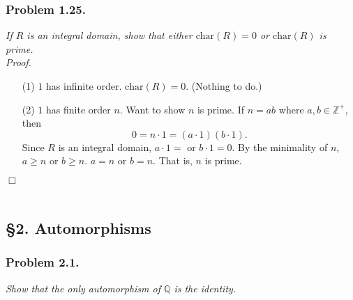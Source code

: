 \documentclass{article}
\begin{document}



\subsubsection*{Problem 1.25.}
\emph{If $R$ is an integral domain, show that either
$\text{char}(R) = 0$ or $\text{char}(R)$ is prime.} \\

\emph{Proof.}
\begin{enumerate}
\item[(1)]
  $1$ has infinite order. $\text{char}(R) = 0$. (Nothing to do.)
\item[(2)]
  $1$ has finite order $n$.
  Want to show $n$ is prime.
  If $n = ab$ where $a, b \in \mathbb{Z}^+$,
  then $$0 = n \cdot 1 = (a \cdot 1)(b \cdot 1).$$
  Since $R$ is an integral domain, $a \cdot 1 = $ or $b \cdot 1 = 0$.
  By the minimality of $n$, $a \geq n$ or $b \geq n$.
  $a = n$ or $b = n$. That is, $n$ is prime.
\end{enumerate}
$\Box$ \\\\






\subsection*{\S 2. Automorphisms \\}



\subsubsection*{Problem 2.1.}
\emph{Show that the only automorphism of $\mathbb{Q}$ is the identity.} \\
\end{document}
